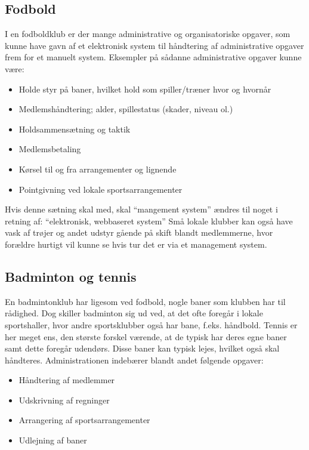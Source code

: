 \subsection{Fodbold} \label{Fodbold}
I en fodboldklub er der mange administrative og organisatoriske opgaver, som kunne have gavn af et elektronisk system
til håndtering af administrative opgaver frem for et manuelt system. Eksempler på sådanne
administrative opgaver kunne være:

\begin{itemize}
\item Holde styr på baner, hvilket hold som spiller/træner hvor og hvornår
\item Medlemshåndtering; alder, spillestatus (skader, niveau ol.)
\item Holdsammensætning og taktik
\item Medlemsbetaling
\item Kørsel til og fra arrangementer og lignende
\item Pointgivning ved lokale sportsarrangementer
\end{itemize}

\begin{anfxnote}{Hvis denne sætning skal med, skal ``mangement system'' ændres til noget i retning af: ``elektronisk, webbaseret system''}
Små lokale klubber kan også have vask af trøjer og andet udstyr gående på skift blandt medlemmerne, hvor forældre hurtigt vil kunne se hvis tur det er via et management system. 
\end{anfxnote}


\subsection{Badminton og tennis}
En badmintonklub har ligesom ved fodbold, nogle baner som klubben har til rådighed. Dog skiller badminton sig ud ved, at det ofte foregår i lokale sportshaller, hvor andre sportsklubber også har bane, f.eks. håndbold. Tennis er her meget ens, den største forskel værende, at de typisk har deres egne baner samt dette foregår udendørs. Disse baner kan typisk lejes, hvilket også skal håndteres. Administrationen indebærer blandt andet følgende opgaver:
\begin{itemize}
\item Håndtering af medlemmer
\item Udskrivning af regninger
\item Arrangering af sportsarrangementer
\item Udlejning af baner
\end{itemize}

